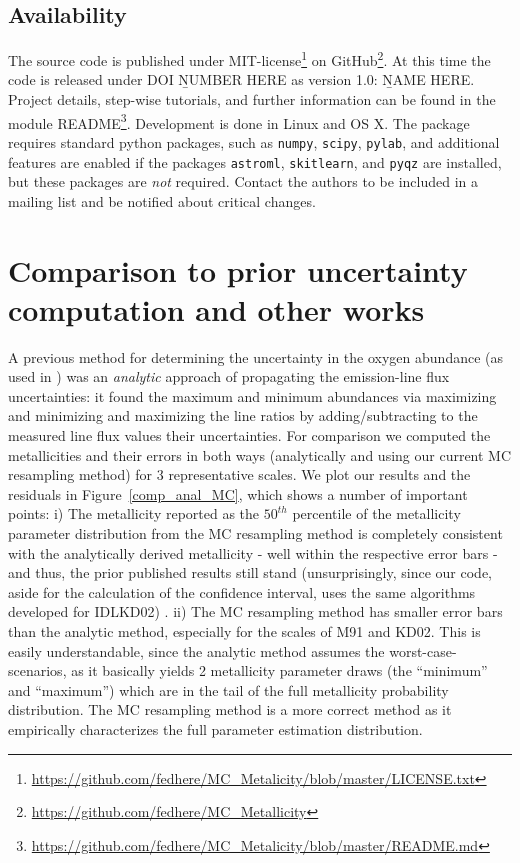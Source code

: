 \documentclass{emulateapj}
\begin{document}
\subsection{Availability}
The source code is published under MIT-license\footnote{\url{https://github.com/fedhere/MC_Metalicity/blob/master/LICENSE.txt}} on GitHub\footnote{\url{https://github.com/fedhere/MC_Metallicity}}. At this time the code is released under DOI {\b NUMBER HERE} as version 1.0: {\b NAME HERE}. Project
details, step-wise tutorials, and further information can be found in the module README\footnote{\url{https://github.com/fedhere/MC_Metalicity/blob/master/README.md}}.
Development is done in Linux and OS X. The package requires standard python packages, such as \verb=numpy=, \verb=scipy=, \verb=pylab=, and additional features are enabled if the packages \verb=astroml=, \verb=skitlearn=, and \verb=pyqz= are installed, but these packages are \emph{not} required. Contact the authors to be included in a mailing list and be notified about critical changes. 




\section{Comparison to prior uncertainty computation and other works }\label{comp_sec}


A previous method for determining the uncertainty in the oxygen abundance (as used in \citealt{modjaz08_Z,kewley10,rupke10,modjaz11}) was an \emph{analytic} approach of propagating the emission-line flux uncertainties: it found the maximum and minimum abundances via maximizing and minimizing and maximizing the line ratios by adding/subtracting to the measured line flux values their uncertainties. For comparison we computed the metallicities and their errors in both ways (analytically and using our current MC resampling method) for 3 representative scales. We plot our results and the residuals in Figure~\ref{comp_anal_MC}, which shows a number of important points: i) The metallicity reported as the $50^{th}$ percentile of the metallicity parameter distribution from the MC resampling method is completely consistent with the analytically derived metallicity -  well within the respective error bars - and thus, the prior published results still stand (unsurprisingly, since our code, aside for the calculation of the confidence interval, uses the same algorithms developed for IDLKD02)
. ii) The MC resampling method has smaller error bars than the analytic method, especially for the scales of M91 and KD02. This is easily understandable, since the analytic method assumes the worst-case-scenarios, as it basically yields 2 metallicity parameter draws (the ``minimum'' and ``maximum'') which are in the tail of the full metallicity probability distribution. The MC resampling method is a more correct method as it empirically characterizes the full parameter estimation distribution.
\end{document}
